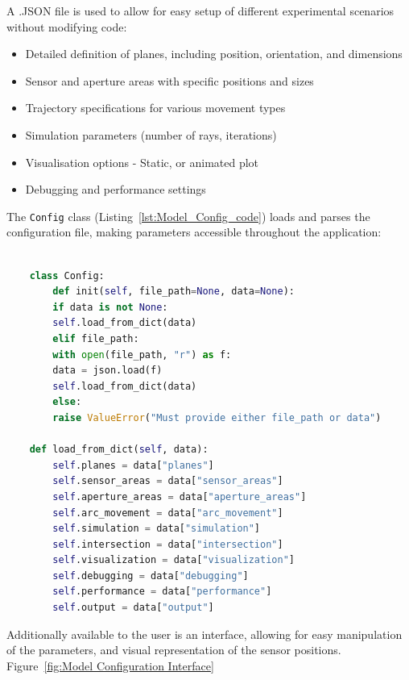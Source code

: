 A .JSON file is used to allow for easy setup of different experimental scenarios without modifying code:

\begin{itemize}
\item Detailed definition of planes, including position, orientation, and dimensions
\item Sensor and aperture areas with specific positions and sizes
\item Trajectory specifications for various movement types
\item Simulation parameters (number of rays, iterations)
\item Visualisation options - Static, or animated plot 
\item Debugging and performance settings
\end{itemize}

The \texttt{Config} class (Listing~\ref{lst:Model_Config_code}) loads and parses the configuration file, making parameters accessible throughout the application:
\begin{lstlisting}[style=pythonstyle, caption=Model configuration - Config Class, label=lst:Model_Config_code, language=Python ]
    
    class Config:
        def init(self, file_path=None, data=None):
        if data is not None:
        self.load_from_dict(data)
        elif file_path:
        with open(file_path, "r") as f:
        data = json.load(f)
        self.load_from_dict(data)
        else:
        raise ValueError("Must provide either file_path or data")
    
    def load_from_dict(self, data):
        self.planes = data["planes"]
        self.sensor_areas = data["sensor_areas"]
        self.aperture_areas = data["aperture_areas"]
        self.arc_movement = data["arc_movement"]
        self.simulation = data["simulation"]
        self.intersection = data["intersection"]
        self.visualization = data["visualization"]
        self.debugging = data["debugging"]
        self.performance = data["performance"]
        self.output = data["output"]
    \end{lstlisting}

Additionally available to the user is an interface, allowing for easy manipulation of the parameters, and visual representation of the sensor positions. Figure~\ref{fig:Model Configuration Interface} 

